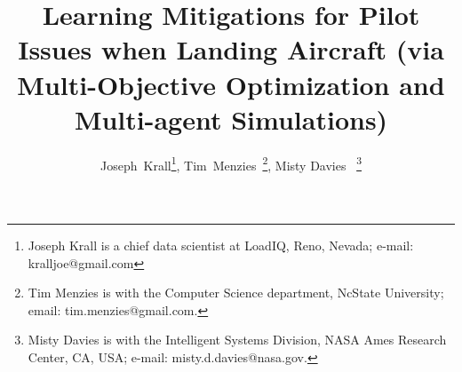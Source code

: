 \documentclass[journal]{IEEEtran}
\begin{document}
\title{Learning Mitigations for Pilot Issues when Landing   Aircraft 
(via Multi-Objective Optimization and Multi-agent Simulations)}


\author{Joseph~Krall\thanks{ Joseph Krall is a chief data scientist at LoadIQ, Reno, Nevada; 
e-mail: kralljoe@gmail.com}, %
Tim~Menzies~\thanks{Tim Menzies is with the Computer Science department, NcState University; email:  tim.menzies@gmail.com.}, %
Misty Davies~
\thanks{
Misty Davies is with the Intelligent Systems Division,
NASA Ames Research Center, CA, USA;
e-mail:
misty.d.davies@nasa.gov.}
}

\maketitle
\end{document}
